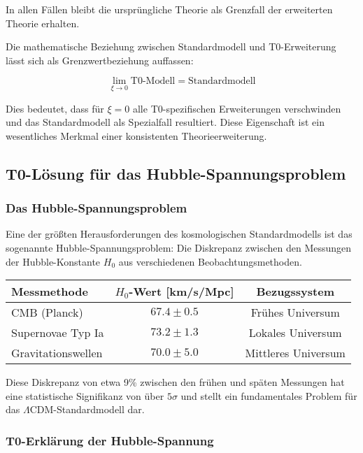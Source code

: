 \documentclass[12pt,a4paper]{article}
\theoremstyle{definition}
\begin{document}
In allen Fällen bleibt die ursprüngliche Theorie als Grenzfall der erweiterten Theorie erhalten.

\begin{verhaltnis}
	Die mathematische Beziehung zwischen Standardmodell und T0-Erweiterung lässt sich als Grenzwertbeziehung auffassen:
	
	\begin{equation}
		\lim_{\xi \to 0} \text{T0-Modell} = \text{Standardmodell}
	\end{equation}
	
	Dies bedeutet, dass für $\xi = 0$ alle T0-spezifischen Erweiterungen verschwinden und das Standardmodell als Spezialfall resultiert. Diese Eigenschaft ist ein wesentliches Merkmal einer konsistenten Theorieerweiterung.
\end{verhaltnis}\subsection{T0-Lösung für das Hubble-Spannungsproblem}

\subsubsection{Das Hubble-Spannungsproblem}

Eine der größten Herausforderungen des kosmologischen Standardmodells ist das sogenannte Hubble-Spannungsproblem: Die Diskrepanz zwischen den Messungen der Hubble-Konstante $H_0$ aus verschiedenen Beobachtungsmethoden.

\begin{center}
	\begin{tabular}{|l|c|c|}
		\hline
		\textbf{Messmethode} & \textbf{$H_0$-Wert [km/s/Mpc]} & \textbf{Bezugssystem} \\
		\hline
		CMB (Planck) & $67.4 \pm 0.5$ & Frühes Universum \\
		\hline
		Supernovae Typ Ia & $73.2 \pm 1.3$ & Lokales Universum \\
		\hline
		Gravitationswellen & $70.0 \pm 5.0$ & Mittleres Universum \\
		\hline
	\end{tabular}
\end{center}

Diese Diskrepanz von etwa 9\% zwischen den frühen und späten Messungen hat eine statistische Signifikanz von über $5\sigma$ und stellt ein fundamentales Problem für das $\Lambda$CDM-Standardmodell dar.

\subsubsection{T0-Erklärung der Hubble-Spannung}
\end{document}
